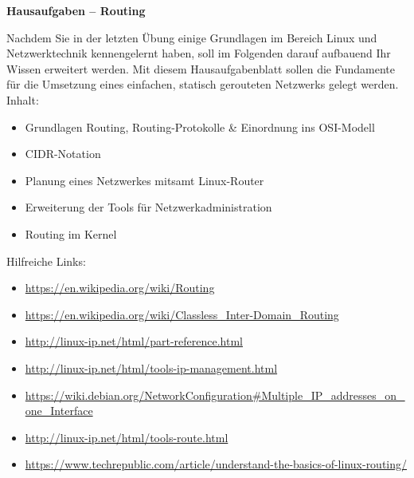 \documentclass[paper=a4,fontsize=11pt]{scrartcl}%
\numberwithin{equation}{section}
\begin{document}
\begin{center}
\Large{\textbf{Hausaufgaben -- Routing}}\\
\end{center}
Nachdem Sie in der letzten Übung einige Grundlagen im Bereich Linux und Netzwerktechnik kennengelernt haben, soll im Folgenden darauf aufbauend Ihr Wissen erweitert werden. Mit diesem Hausaufgabenblatt sollen die Fundamente für die Umsetzung eines einfachen, statisch gerouteten Netzwerks gelegt werden.\\
Inhalt:
\begin{itemize}
	\item Grundlagen Routing, Routing-Protokolle \& Einordnung ins OSI-Modell 
	\item CIDR-Notation
	\item Planung eines Netzwerkes mitsamt Linux-Router
	\item Erweiterung der Tools für Netzwerkadministration
	\item Routing im Kernel
\end{itemize}
Hilfreiche Links:
\begin{itemize}
	\item \url{https://en.wikipedia.org/wiki/Routing}
	\item \url{https://en.wikipedia.org/wiki/Classless_Inter-Domain_Routing}
	\item \url{http://linux-ip.net/html/part-reference.html}
	\item \url{ http://linux-ip.net/html/tools-ip-management.html}
	\item \url{https://wiki.debian.org/NetworkConfiguration#Multiple_IP_addresses_on_one_Interface}
	\item \url{http://linux-ip.net/html/tools-route.html}
	\item \url{https://www.techrepublic.com/article/understand-the-basics-of-linux-routing/}
\end{itemize}
\end{document}
